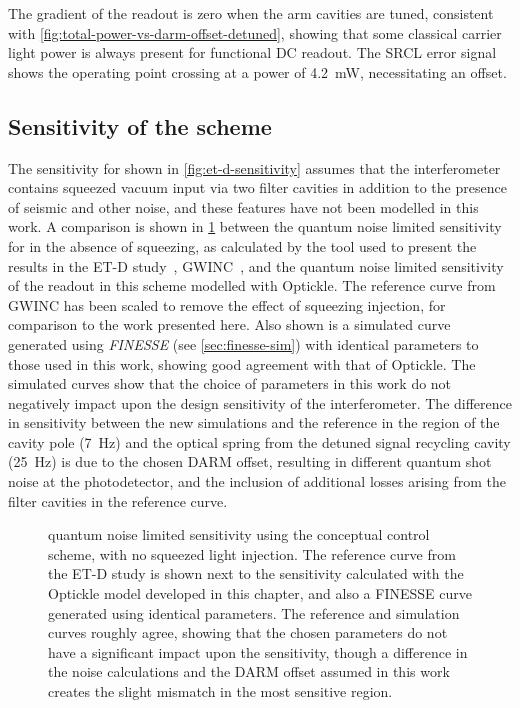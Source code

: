 The gradient of the \ASDC{} readout is zero when the arm cavities are tuned, consistent with \cref{fig:total-power-vs-darm-offset-detuned}, showing that some classical carrier light power is always present for functional \gls{DC} readout. The \gls{SRCL} error signal shows the operating point crossing at a power of \SI{4.2}{\milli\watt}, necessitating an offset.

\subsection{Sensitivity of the scheme}
The sensitivity for \ETLF{} shown in \cref{fig:et-d-sensitivity} assumes that the interferometer contains squeezed vacuum input via two filter cavities in addition to the presence of seismic and other noise, and these features have not been modelled in this work. A comparison is shown in \cref{fig:et-lf-control-scheme-sensitivity} between the quantum noise limited sensitivity for \ETLF{} in the absence of squeezing, as calculated by the tool used to present the results in the ET-D study~\cite{Hild2011}, \gls{GWINC}~\cite{gwinc}, and the quantum noise limited sensitivity of the \ASDC{} readout in this scheme modelled with Optickle. The reference curve from \gls{GWINC} has been scaled to remove the effect of squeezing injection, for comparison to the work presented here. Also shown is a simulated curve generated using \emph{\gls{FINESSE}} (see \cref{sec:finesse-sim}) with identical parameters to those used in this work, showing good agreement with that of Optickle. The simulated curves show that the choice of parameters in this work do not negatively impact upon the design sensitivity of the interferometer. The difference in sensitivity between the new simulations and the reference in the region of the cavity pole (\SI{7}{\hertz}) and the optical spring from the detuned signal recycling cavity (\SI{25}{\hertz}) is due to the chosen \gls{DARM} offset, resulting in different quantum shot noise at the photodetector, and the inclusion of additional losses arising from the filter cavities in the reference curve.

\begin{figure}
  \centering
  
  \caption[ET-LF quantum noise limited sensitivity using the conceptual control scheme]{\label{fig:et-lf-control-scheme-sensitivity}\ETLF{} quantum noise limited sensitivity using the conceptual control scheme, with no squeezed light injection. The reference curve from the ET-D study is shown next to the sensitivity calculated with the Optickle model developed in this chapter, and also a \gls{FINESSE} curve generated using identical parameters. The reference and simulation curves roughly agree, showing that the chosen parameters do not have a significant impact upon the sensitivity, though a difference in the noise calculations and the \gls{DARM} offset assumed in this work creates the slight mismatch in the most sensitive region.}
\end{figure}

